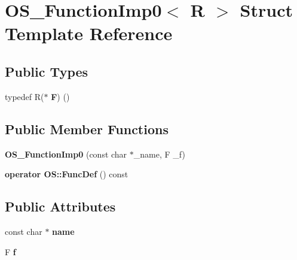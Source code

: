 \hypertarget{struct_o_s___function_imp0}{}\section{O\+S\+\_\+\+Function\+Imp0$<$ R $>$ Struct Template Reference}
\label{struct_o_s___function_imp0}
\subsection*{Public Types}
\begin{DoxyCompactItemize}
\item 
typedef R($\ast$ {\bfseries F}) ()\hypertarget{struct_o_s___function_imp0_ac26157bacbb5b974449c6b76e89f0cc3}{}\label{struct_o_s___function_imp0_ac26157bacbb5b974449c6b76e89f0cc3}

\end{DoxyCompactItemize}
\subsection*{Public Member Functions}
\begin{DoxyCompactItemize}
\item 
{\bfseries O\+S\+\_\+\+Function\+Imp0} (const char $\ast$\+\_\+name, F \+\_\+f)\hypertarget{struct_o_s___function_imp0_a0521293472603ec33d5718cc7030e40f}{}\label{struct_o_s___function_imp0_a0521293472603ec33d5718cc7030e40f}

\item 
{\bfseries operator O\+S\+::\+Func\+Def} () const \hypertarget{struct_o_s___function_imp0_a3b0f134150fdc44c75af80dcf4838292}{}\label{struct_o_s___function_imp0_a3b0f134150fdc44c75af80dcf4838292}

\end{DoxyCompactItemize}
\subsection*{Public Attributes}
\begin{DoxyCompactItemize}
\item 
const char $\ast$ {\bfseries name}\hypertarget{struct_o_s___function_imp0_a0606880ea6ebb5b895a0c9995d7faea2}{}\label{struct_o_s___function_imp0_a0606880ea6ebb5b895a0c9995d7faea2}

\item 
F {\bfseries f}\hypertarget{struct_o_s___function_imp0_af9ed3c356d1877c10ffd95c83cd0026f}{}\label{struct_o_s___function_imp0_af9ed3c356d1877c10ffd95c83cd0026f}

\end{DoxyCompactItemize}


